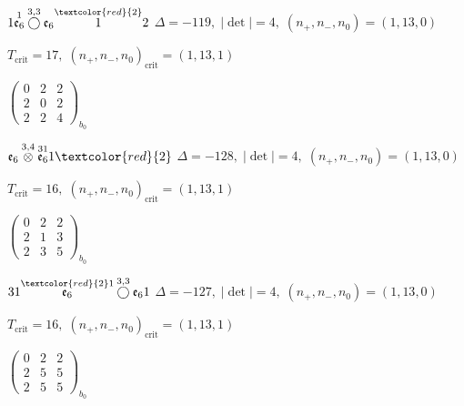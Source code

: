 \documentclass[10pt]{article}
\begin{document}
\smallskip

$1\overset{1}{\mathfrak{e}_6}\overset{3,3}{\bigcirc}\mathfrak{e}_6\overset{\textcolor{red}{2}}{1}2$ \quad $\Delta=-119,\; |\det|=4,\; (n_+,n_-,n_0)=(1,13,0)$

\hspace{1em}$T_{\text{crit}}=17,\; (n_+,n_-,n_0)_{\text{crit}}=(1,13,1)$

\hspace{2em}$\left(\begin{smallmatrix}0 & 2 & 2 \\ 2 & 0 & 2 \\ 2 & 2 & 4\end{smallmatrix}\right)_{\!b_0}$

\smallskip

$\mathfrak{e}_6\overset{3,4}{\otimes}\overset{31}{\mathfrak{e}_6}1\textcolor{red}{2}$ \quad $\Delta=-128,\; |\det|=4,\; (n_+,n_-,n_0)=(1,13,0)$

\hspace{1em}$T_{\text{crit}}=16,\; (n_+,n_-,n_0)_{\text{crit}}=(1,13,1)$

\hspace{2em}$\left(\begin{smallmatrix}0 & 2 & 2 \\ 2 & 1 & 3 \\ 2 & 3 & 5\end{smallmatrix}\right)_{\!b_0}$

\smallskip

$31\overset{\textcolor{red}{2}1}{\mathfrak{e}_6}\overset{3,3}{\bigcirc}\mathfrak{e}_61$ \quad $\Delta=-127,\; |\det|=4,\; (n_+,n_-,n_0)=(1,13,0)$

\hspace{1em}$T_{\text{crit}}=16,\; (n_+,n_-,n_0)_{\text{crit}}=(1,13,1)$

\hspace{2em}$\left(\begin{smallmatrix}0 & 2 & 2 \\ 2 & 5 & 5 \\ 2 & 5 & 5\end{smallmatrix}\right)_{\!b_0}$

\smallskip
\end{document}

